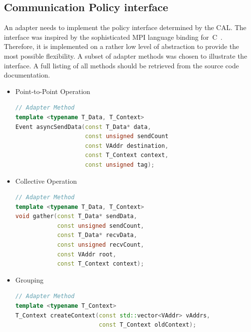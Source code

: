 \subsection{Communication Policy interface}
\label{sec:impl:policy_interface}
An adapter needs to implement the policy interface determined by the
CAL.  The interface was inspired by the sophisticated MPI language
binding for~C~\cite{ref:mpi_c_binding}. Therefore, it is implemented
on a rather low level of abstraction to provide the most possible
flexibility.  A subset of adapter methods was chosen to illustrate
the interface. A full listing of all methods should be retrieved from
the source code documentation.

\begin{itemize}

\item Point-to-Point Operation

  \begin{minipage}[t]{\textwidth} 
    \begin{lstlisting}[language=C++, breaklines=false, label={}]
// Adapter Method      
template <typename T_Data, T_Context>      
Event asyncSendData(const T_Data* data,      
                    const unsigned sendCount
                    const VAddr destination,
                    const T_Context context,
                    const unsigned tag); 
    \end{lstlisting}
    \end{minipage}
    
\item Collective Operation
  
  \begin{minipage}[t]{\textwidth} 
    \begin{lstlisting}[language=C++, breaklines=false, label={}]
// Adapter Method      
template <typename T_Data, T_Context>      
void gather(const T_Data* sendData,
            const unsigned sendCount,
            const T_Data* recvData,
            const unsigned recvCount,
            const VAddr root,
            const T_Context context);
    \end{lstlisting}
    \end{minipage}

\item Grouping
  
  \begin{minipage}[t]{\textwidth} 
    \begin{lstlisting}[language=C++, breaklines=false, label={}]
// Adapter Method
template <typename T_Context>      
T_Context createContext(const std::vector<VAddr> vAddrs,
                        const T_Context oldContext);
    \end{lstlisting}
    \end{minipage}
  
\end{itemize}

